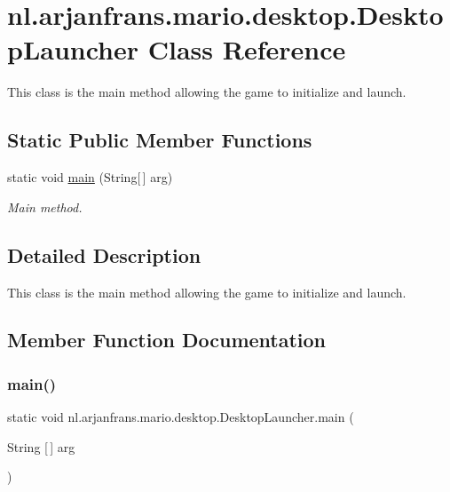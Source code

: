\hypertarget{classnl_1_1arjanfrans_1_1mario_1_1desktop_1_1DesktopLauncher}{}\section{nl.\+arjanfrans.\+mario.\+desktop.\+Desktop\+Launcher Class Reference}
\label{classnl_1_1arjanfrans_1_1mario_1_1desktop_1_1DesktopLauncher}


This class is the main method allowing the game to initialize and launch.  


\subsection*{Static Public Member Functions}
\begin{DoxyCompactItemize}
\item 
static void \hyperlink{classnl_1_1arjanfrans_1_1mario_1_1desktop_1_1DesktopLauncher_a428f564507af2ce16685de5532f8ad0b}{main} (String\mbox{[}$\,$\mbox{]} arg)
\begin{DoxyCompactList}\small\item\em Main method. \end{DoxyCompactList}\end{DoxyCompactItemize}


\subsection{Detailed Description}
This class is the main method allowing the game to initialize and launch. 

\subsection{Member Function Documentation}
\mbox{\label{classnl_1_1arjanfrans_1_1mario_1_1desktop_1_1DesktopLauncher_a428f564507af2ce16685de5532f8ad0b}} 
\subsubsection{\texorpdfstring{main()}{main()}}
{\footnotesize\ttfamily static void nl.\+arjanfrans.\+mario.\+desktop.\+Desktop\+Launcher.\+main (\begin{DoxyParamCaption}\item[{String \mbox{[}$\,$\mbox{]}}]{arg }\end{DoxyParamCaption})\hspace{0.3cm}{\ttfamily [static]}}



